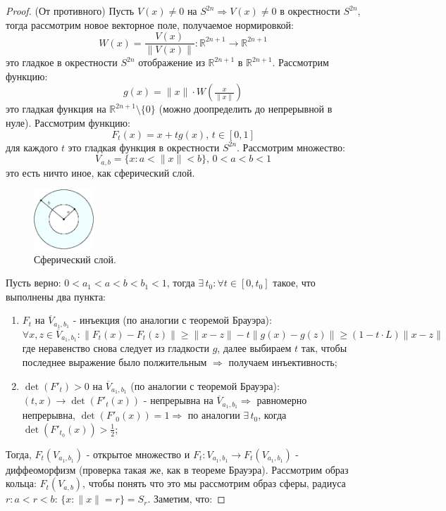 \documentclass[12pt]{article}
\newcommand{\MR}{\mathbb{R}}
\theoremstyle{definition}
\newcommand{\ovl}[1]{\overline{#1}}
\begin{document}
\begin{proof}
	(От противного) Пусть $V(x) \neq 0$ на $S^{2n} \Rightarrow V(x) \neq 0$ в окрестности $S^{2n}$, тогда рассмотрим новое векторное поле, получаемое нормировкой:
	$$
		W(x) = \dfrac{V(x)}{\|V(x)\|} \colon \MR^{2n+1} \to\MR^{2n+1}
	$$
	это гладкое в окрестности $S^{2n}$ отображение из $\MR^{2n+1}$ в $\MR^{2n+1}$. Рассмотрим функцию:
	$$
		g(x) = \|x\|{\cdot}W\left(\tfrac{x}{\|x\|}\right)
	$$
	это гладкая функция на $\MR^{2n+1} \setminus \{0\}$ (можно доопределить до непрерывной в нуле). Рассмотрим функцию:
	$$
		F_t(x) = x + tg(x),\, t \in [0,1]
	$$
	для каждого $t$ это гладкая функция в окрестности $S^{2n}$. Рассмотрим множество:
	$$
		V_{a,b} = \{x \colon a < \|x\| < b\}, \, 0 < a < b < 1
	$$
	это есть ничто иное, как сферический слой. 
	\begin{figure}[H]
		\centering
		\includegraphics[width=0.2\textwidth]{MA4L8_2.eps}
		\caption{Сферический слой.}
		\label{8_2}
	\end{figure}
	Пусть верно: $0 < a_1 < a < b < b_1 < 1$, тогда $\exists \, t_0 \colon \forall t \in [0,t_0]$ такое, что выполнены два пункта:
	\begin{enumerate}[label=\arabic*)]
		\item $F_t$ на $\ovl{V}_{a_1,b_1}$ - инъекция (по аналогии с теоремой Брауэра):
		$$
			\forall x,z \in \ovl{V}_{a_1,b_1} \colon \|F_t(x) - F_t(z)\| \geq \|x - z\| - t\|g(x) - g(z)\| \geq (1 - t{\cdot}L)\|x - z\|
		$$
		где неравенство снова следует из гладкости $g$, далее выбираем $t$ так, чтобы последнее выражение было полжительным $\Rightarrow$ получаем инъективность;
		\item $\det{(F'_t)} > 0$ на $\ovl{V}_{a_1,b_1}$ (по аналогии с теоремой Брауэра): $(t,x) \to \det{(F'_t(x))}$ - непрерывна на $\ovl{V}_{a_1,b_1} \Rightarrow$ равномерно непрерывна, $\det(F'_0(x)) = 1 \Rightarrow$ по аналогии $\exists \, t_0$, когда $\det(F'_{t_0}(x)) > \frac{1}{2}$;
	\end{enumerate}
	Тогда, $F_t(V_{a_1,b_1})$ - открытое множество и $F_t \colon V_{a_1,b_1} \to F_t(V_{a_1,b_1})$ - диффеоморфизм (проверка такая же, как в теореме Брауэра). Рассмотрим образ кольца: $F_t(V_{a,b})$, чтобы понять что это мы рассмотрим образ сферы, радиуса $r \colon a < r < b$: $\{x \colon \|x\| =r \} = S_r$. Заметим, что:

\end{proof}
\end{document}
